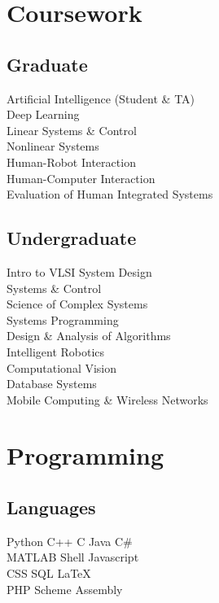 \documentclass[]{_deedy-resume}
\begin{document}
\begin{minipage}[t]{0.33\textwidth}

\section{Coursework}
\subsection{Graduate}
Artificial Intelligence {\scriptsize (Student \& TA)} \\
Deep Learning \\
Linear Systems \& Control \\
Nonlinear Systems \\
Human-Robot Interaction \\
Human-Computer Interaction \\
Evaluation of Human Integrated Systems \\
\sectionsep

\subsection{Undergraduate}
Intro to VLSI System Design \\
Systems \& Control \\
Science of Complex Systems \\
Systems Programming \\
Design \& Analysis of Algorithms \\
Intelligent Robotics \\
Computational Vision \\
Database Systems \\
Mobile Computing \& Wireless Networks \\


\section{Programming}
\subsection{Languages}
Python \textbullet{} C++ \textbullet{} C \textbullet{} Java \textbullet{} C\# \\
MATLAB \textbullet{} Shell \textbullet{} Javascript \\
CSS \textbullet{} SQL \textbullet{} \LaTeX \\
PHP \textbullet{} Scheme \textbullet{} Assembly \\
\sectionsep


\end{minipage}
\end{document}
